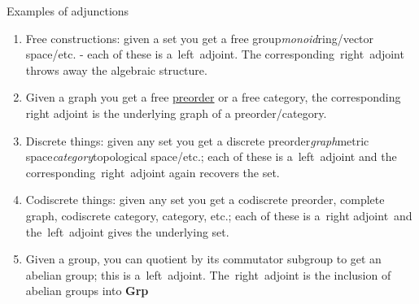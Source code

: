 Examples of adjunctions
\begin{enumerate}
  \item Free constructions: given a set you get a free group\emph{monoid}ring/vector space/etc. - each of these is a \,left\, adjoint. The corresponding \,right\, adjoint throws away the algebraic structure.
  \item Given a graph you get a free \href{doc/1 math/Seven Sketches in Compositionality/Chapter 1: Generative Effects/3 Preorders/1 Preorder}{preorder} or a free category, the corresponding right adjoint is the underlying graph of a preorder/category.
  \item Discrete things: given any set you get a discrete preorder\emph{graph}metric space\emph{category}topological space/etc.; each of these is a \,left\, adjoint and the corresponding \,right\, adjoint again recovers the set.
  \item Codiscrete things: given any set you get a codiscrete preorder, complete graph, codiscrete category, category, etc.; each of these is a \,right adjoint\, and the \,left\, adjoint gives the underlying set.
  \item Given a group, you can quotient by its commutator subgroup to get an abelian group; this is a \,left\, adjoint. The \,right\, adjoint is the inclusion of abelian groups into \textbf{Grp}
\end{enumerate}